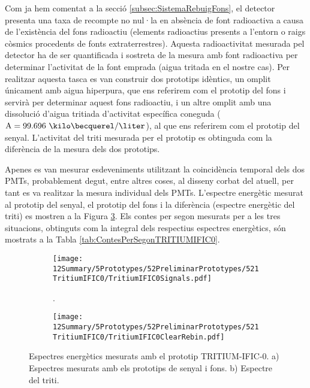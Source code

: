 Com ja hem comentat a la secció \ref{subsec:SistemaRebuigFons}, el detector presenta una taxa de recompte no nul·la en absència de font radioactiva a causa de l'existència del fons radioactiu (elements radioactius presents a l'entorn o raigs còsmics procedents de fonts extraterrestres). Aquesta radioactivitat mesurada pel detector ha de ser quantificada i sostreta de la mesura amb font radioactiva per determinar l'activitat de la font emprada (aigua tritada en el nostre cas). Per realitzar aquesta tasca es van construir dos prototips idèntics, un omplit únicament amb aigua hiperpura, que ens referirem com el prototip del fons i servirà per determinar aquest fons radioactiu, i un altre omplit amb una dissolució d'aigua tritiada d'activitat específica coneguda ($\text{A}=99.696~\kilo\becquerel/\liter$), al que ens referirem com el prototip del senyal. L'activitat del triti mesurada per el prototip es obtinguda com la diferència de la mesura dels dos prototips.

Apenes es van mesurar esdeveniments utilitzant la coincidència temporal dels dos PMTs, probablement degut, entre altres coses, al disseny corbat del atuell, per tant es va realitzar la mesura individual dels PMTs. L'espectre energètic mesurat al prototip del senyal, el prototip del fons i la diferència (espectre energètic del triti) es mostren a la Figura \ref{fig:EspectresEnergeticsTritiumIFIC0}. Els contes per segon mesurats per a les tres situacions, obtinguts com la integral dels respectius espectres energètics, són mostrats a la Tabla \ref{tab:ContesPerSegonTRITIUMIFIC0}. 

\begin{figure}
\centering
    \begin{subfigure}[b]{1\textwidth}
    \centering
    \texttt{[image: 12Summary/5Prototypes/52PreliminarPrototypes/521TritiumIFIC0/TritiumIFIC0Signals.pdf]}  
    \caption{.\label{subfig:EspectreSenyalFonsTritiumIFIC0}}
    \end{subfigure}
    \hfill
    \begin{subfigure}[b]{1\textwidth}
    \centering
    \texttt{[image: 12Summary/5Prototypes/52PreliminarPrototypes/521TritiumIFIC0/TritiumIFIC0ClearRebin.pdf]}  
    \caption{\label{subfig:EspectreTritiTritiumIFIC0}}
    \end{subfigure}
 \caption{Espectres energètics mesurats amb el prototip TRITIUM-IFIC-0. a) Espectres mesurats amb els prototips de senyal i fons. b) Espectre del triti.}
 \label{fig:EspectresEnergeticsTritiumIFIC0}
\end{figure}

